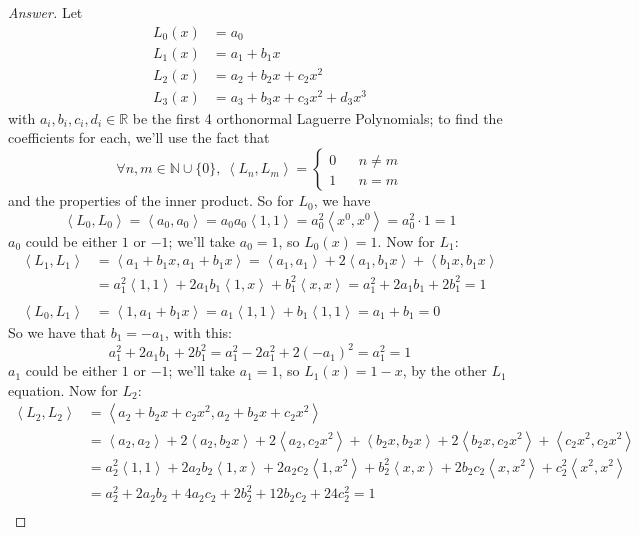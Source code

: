 \documentclass{article}
\newcommand{\R}{\mathbb{R}}
\newcommand{\N}{\mathbb{N}}
\newcommand{\abracks}[1]{\left< #1\right>}
\begin{document}
    \begin{proof}[Answer]
    Let 
    \begin{align*}
    L_0(x) &= a_0 \\
    L_1(x) &= a_1 + b_1x \\
    L_2(x) &= a_2 + b_2x + c_2x^2 \\
    L_3(x) &= a_3 + b_3x + c_3x^2 + d_3x^3
    \end{align*}
    with $a_i, b_i, c_i, d_i \in \R$ be the first 4 orthonormal Laguerre Polynomials; to find the coefficients for each, we'll 
    use the fact that 
    $$\forall n,m \in \N \cup \{0\},\ \abracks{L_n, L_m} = \left\{\begin{array}{lcr}
    0 & & n \neq m \\
    1 & & n = m
    \end{array}\right.$$ and the properties of the inner product. So for $L_0$, we have
    $$\abracks{L_0, L_0} = \abracks{a_0, a_0} = a_0a_0\abracks{1,1} = a_0^2 \abracks{x^0, x^0}
    = a_0^2 \cdot 1 = 1$$
    $a_0$ could be either $1$ or $-1$; we'll take $a_0 = 1$, so $L_0(x) = 1$. Now for $L_1$:
    \begin{align*}
    \abracks{L_1, L_1} &= \abracks{a_1 + b_1x, a_1 + b_1x} = \abracks{a_1,a_1} + 
    2\abracks{a_1, b_1x} + \abracks{b_1x, b_1x} \\
    &= a_1^2\abracks{1,1} + 2a_1b_1\abracks{1, x} + b_1^2\abracks{x, x} = 
    a_1^2 + 2a_1b_1 + 2b_1^2 = 1 \\\\
    \abracks{L_0, L_1} &= \abracks{1, a_1 + b_1x} = a_1\abracks{1,1} + b_1\abracks{1,1} = 
    a_1 + b_1 = 0
    \end{align*}
    So we have that $b_1 = -a_1$, with this:
    $$a_1^2 + 2a_1b_1 + 2b_1^2 = a_1^2 - 2a_1^2 + 2(-a_1)^2 = a_1^2 = 1$$
    $a_1$ could be either $1$ or $-1$; we'll take $a_1 = 1$, so $L_1(x) = 1 - x$, by the other
    $L_1$ equation. Now for $L_2$:
    \begin{align*}
    \abracks{L_2, L_2} &= \abracks{a_2 + b_2x + c_2x^2, a_2 + b_2x + c_2x^2} \\ 
    &= \abracks{a_2, a_2} + 2\abracks{a_2, b_2x} + 2\abracks{a_2, c_2x^2} + 
    \abracks{b_2x, b_2x} + 2\abracks{b_2x, c_2x^2} + \abracks{c_2x^2, c_2x^2} \\
    &= a_2^2\abracks{1, 1} + 2a_2b_2\abracks{1, x} + 2a_2c_2\abracks{1, x^2} + 
    b_2^2\abracks{x, x} + 2b_2c_2\abracks{x, x^2} + c_2^2\abracks{x^2, x^2} \\
    &= a_2^2 + 2a_2b_2 + 4a_2c_2 + 2b_2^2 + 12b_2c_2 + 24c_2^2 = 1 \\

\end{align*}
\end{proof}
\end{document}
